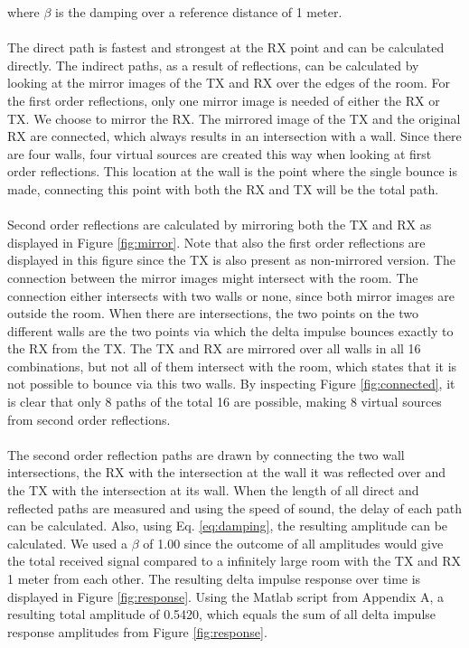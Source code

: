 \documentclass[final]{scrreprt} %
\begin{document}
where $\beta$ is the damping over a reference distance of 1 meter.
\\ \\
The direct path is fastest and strongest at the RX point and can be calculated directly.
The indirect paths, as a result of reflections, can be calculated by looking at the mirror images of the TX and RX over the edges of the room.
For the first order reflections, only one mirror image is needed of either the RX or TX.
We choose to mirror the RX.
The mirrored image of the TX and the original RX are connected, which always results in an intersection with a wall.
Since there are four walls, four virtual sources are created this way when looking at first order reflections.
This location at the wall is the point where the single bounce is made, connecting this point with both the RX and TX will be the total path.
\\ \\
Second order reflections are calculated by mirroring both the TX and RX as displayed in Figure \ref{fig:mirror}.
Note that also the first order reflections are displayed in this figure since the TX is also present as non-mirrored version.
The connection between the mirror images might intersect with the room.
The connection either intersects with two walls or none, since both mirror images are outside the room.
When there are intersections, the two points on the two different walls are the two points via which the delta impulse bounces exactly to the RX from the TX.
The TX and RX are mirrored over all walls in all 16 combinations, but not all of them intersect with the room, which states that it is not possible to bounce via this two walls.
By inspecting Figure \ref{fig:connected}, it is clear that only 8 paths of the total 16 are possible, making 8 virtual sources from second order reflections.
\\ \\
The second order reflection paths are drawn by connecting the two wall intersections, the RX with the intersection at the wall it was reflected over and the TX with the intersection at its wall.
When the length of all direct and reflected paths are measured and using the speed of sound, the delay of each path can be calculated.
Also, using Eq. \ref{eq:damping}, the resulting amplitude can be calculated.
We used a $\beta$ of 1.00 since the outcome of all amplitudes would give the total received signal compared to a infinitely large room with the TX and RX 1 meter from each other.
The resulting delta impulse response over time is displayed in Figure \ref{fig:response}.
Using the Matlab script from Appendix A, a resulting total amplitude of 0.5420, which equals the sum of all delta impulse response amplitudes from Figure \ref{fig:response}.
\end{document}
